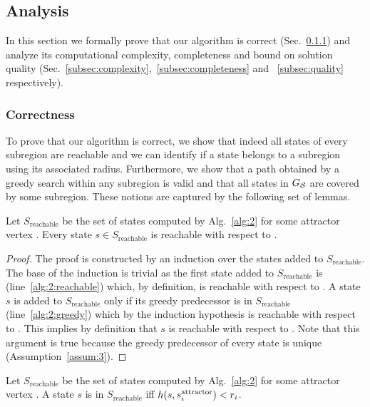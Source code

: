 \documentclass[a4paper,10pt]{article}
\begin{document}
\subsection{Analysis}
\label{sec:analysis}
In this section we formally prove that 
our algorithm is correct (Sec.~\ref{subsec:correct}) and 
analyze its computational complexity, completeness and bound on solution quality (Sec.~\ref{subsec:complexity},~\ref{subsec:completeness} and ~\ref{subsec:quality} respectively).

\subsubsection{Correctness}
\label{subsec:correct}
To prove that our algorithm is correct, we show that indeed all states of every subregion are reachable and we can identify if a state belongs to a subregion using its associated radius.
Furthermore, we show that a path obtained by a greedy search within any subregion is valid and that all states in $G_\mathcal{S}$ are covered by some subregion.
These notions are captured by the following set of lemmas.

\vspace{2mm}
\begin{lemma}
\label{lemma:reachable-1}
Let $S_{\text{reachable}}$ be the set of states computed by Alg.~\ref{alg:2} for some attractor vertex \sAttract.
%
Every state $s \in S_{\text{reachable}}$ is reachable with respect to \sAttract.
\end{lemma}
%
\begin{proof}
The proof is constructed by an induction over the states added to $S_{\text{reachable}}$.
The base of the induction is trivial as the first state added to $S_{\text{reachable}}$  is \sAttract (line~\ref{alg:2:reachable}) which, by definition, is reachable with respect to \sAttract.
%
A state $s$ is added to $S_{\text{reachable}}$ only if its greedy predecessor is in $S_{\text{reachable}}$ (line~\ref{alg:2:greedy}) which by the induction hypothesis is reachable with respect to \sAttract.
This implies by definition that $s$ is reachable with respect to \sAttract.
%
Note that this argument is true because the greedy predecessor of every state is unique (Assumption~\ref{assum:3}).
\end{proof}

\begin{lemma}
\label{lemma:reachable-2}
Let $S_{\text{reachable}}$ be the set of states computed by Alg.~\ref{alg:2} for some attractor vertex \sAttract.
%
A state $s$ is in $S_{\text{reachable}}$ iff $h(s, s^{\text{attractor}}_i) < r_i$.
\end{lemma}
\end{document}
